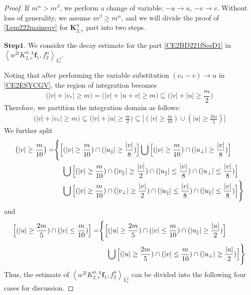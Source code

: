 \documentclass[reqno]{amsart}
\numberwithin{equation}{section}
\numberwithin{equation}{section}
\begin{document}
\begin{proof}
		 If $m^\alpha>m^\beta$, we perform a change of variable:
		$-u\rightarrow u$, $-v\rightarrow v$.
		Without loss of generality, we assume $m^\beta\geq m^\alpha$, and we will divide the proof of \eqref{Lem222maineqv} for $\mathbf{K}_{2,r}^{\chi}$ part into two steps.
		
		$\mathbf{Step 1}$. We consider the decay estimate for the part \eqref{CE2BD221fSesD1} in $\left \langle  w^{2l}K_{2,r}^{\alpha,\chi}\mathbf{f}_1,f^{\alpha}_2\right \rangle_{L^{2}_{v}}$.
		
		 Noting that after performing the variable substitution $(v_*- v)\rightarrow u$ in  \eqref{CE2ESYCGV}, the region of integration becomes 
		\begin{equation*}
			\big(|v|+|v_*|\geq m\big) =  \big(|v|+|u+v|\geq m\big)\subseteq \big(|v|+|u|\geq \frac{m}{2}\big)
		\end{equation*}
		Therefore, we partition the integration domain as follows: 
		\begin{equation*}
			\begin{split}
				\big(|v|+|v_*|\geq m\big)\subseteq \big(|v|+|u|\geq \frac{m}{2}\big)\subseteq\Big[(|v|\geq \frac{m}{10})\cup(|u|\geq \frac{2m}{5})\Big]
			\end{split}
		\end{equation*}
		We further  split 
		\begin{equation*}
			\begin{split}
				\big(|v|\geq \frac{m}{10}\big)=&\Biggl\{\Big[(|v|\geq \frac{m}{10})\cap(|u_\parallel|\geq \frac{|v|}{8})\Big]\bigcup\Big[(|v|\geq \frac{m}{10})\cap(|u_\perp|\geq \frac{|v|}{8})\Big]\\
				&\hspace{0.4cm}\bigcup\Big[(|v|\geq \frac{m}{10})\cap(|v_\parallel|\geq \frac{|v|}{2})\cap(|u_\parallel|\leq \frac{|v|}{8})\cap(|u_\perp|\leq \frac{|v|}{8})\Big]\\
				&\hspace{0.4cm}\bigcup\Big[(|v|\geq \frac{m}{10})\cap(|v_\perp|\geq \frac{|v|}{2})\cap(|u_\parallel|\leq \frac{|v|}{8})\cap(|u_\parallel|\leq \frac{|v|}{8})\Big]\Biggr\}
			\end{split}
		\end{equation*}
		and
		\begin{equation*}
			\begin{split}
				\Big[(|u|\geq \frac{2m}{5})\cap	(|v|\leq \frac{m}{10})\Big]=&\Biggl\{\Big[(|u|\geq \frac{2m}{5})\cap(|v|\leq \frac{m}{10})\cap	(|u_\parallel|\geq \frac{|u|}{2})\Big]\\
				&\hspace{0.4cm}\bigcup\Big[(|u|\geq \frac{2m}{5})\cap(|v|\leq \frac{m}{10})\cap(|u_\perp|\geq \frac{|u|}{2})\Big]\Biggr\}
			\end{split}
		\end{equation*}
		Thus, the estimate of $\left \langle  w^{2l}K_{2,r}^{\alpha,\chi}\mathbf{f}_1,f^{\alpha}_2\right \rangle_{L^{2}_{v}}$ can be divided into the following four cases for discussion.
		

\end{proof}
\end{document}
